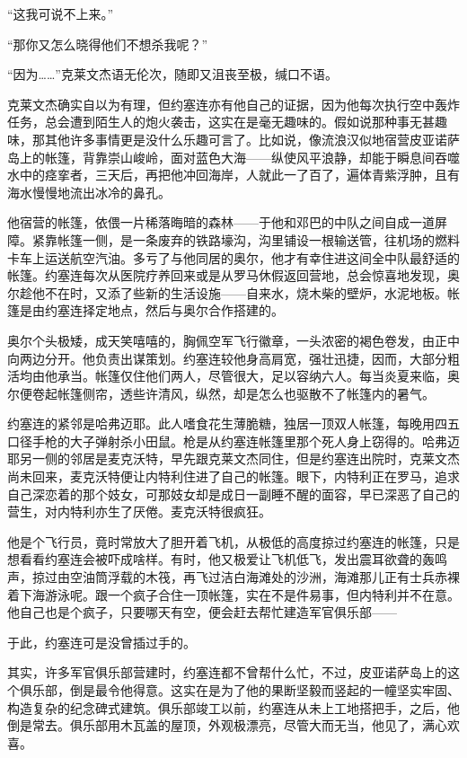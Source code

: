     “这我可说不上来。”

    “那你又怎么晓得他们不想杀我呢？”

    “因为……”克莱文杰语无伦次，随即又沮丧至极，缄口不语。

    克莱文杰确实自以为有理，但约塞连亦有他自己的证据，因为他每次执行空中轰炸任务，总会遭到陌生人的炮火袭击，这实在是毫无趣味的。假如说那种事无甚趣味，那其他许多事情更是没什么乐趣可言了。比如说，像流浪汉似地宿营皮亚诺萨岛上的帐篷，背靠崇山峻岭，面对蓝色大海——纵使风平浪静，却能于瞬息间吞噬水中的痉挛者，三天后，再把他冲回海岸，人就此一了百了，遍体青紫浮肿，且有海水慢慢地流出冰冷的鼻孔。

    他宿营的帐篷，依偎一片稀落晦暗的森林——于他和邓巴的中队之间自成一道屏障。紧靠帐篷一侧，是一条废弃的铁路壕沟，沟里铺设一根输送管，往机场的燃料卡车上运送航空汽油。多亏了与他同居的奥尔，他才有幸住进这间全中队最舒适的帐篷。约塞连每次从医院疗养回来或是从罗马休假返回营地，总会惊喜地发现，奥尔趁他不在时，又添了些新的生活设施——自来水，烧木柴的壁炉，水泥地板。帐篷是由约塞连择定地点，然后与奥尔合作搭建的。

 


    奥尔个头极矮，成天笑嘻嘻的，胸佩空军飞行徽章，一头浓密的褐色卷发，由正中向两边分开。他负责出谋策划。约塞连较他身高肩宽，强壮迅捷，因而，大部分粗活均由他承当。帐篷仅住他们两人，尽管很大，足以容纳六人。每当炎夏来临，奥尔便卷起帐篷侧帘，透些许清风，纵然，却是怎么也驱散不了帐篷内的暑气。

    约塞连的紧邻是哈弗迈耶。此人嗜食花生薄脆糖，独居一顶双人帐篷，每晚用四五口径手枪的大子弹射杀小田鼠。枪是从约塞连帐篷里那个死人身上窃得的。哈弗迈耶另一侧的邻居是麦克沃特，早先跟克莱文杰同住，但是约塞连出院时，克莱文杰尚未回来，麦克沃特便让内特利住进了自己的帐篷。眼下，内特利正在罗马，追求自己深恋着的那个妓女，可那妓女却是成日一副睡不醒的面容，早已深恶了自己的营生，对内特利亦生了厌倦。麦克沃特很疯狂。

    他是个飞行员，竟时常放大了胆开着飞机，从极低的高度掠过约塞连的帐篷，只是想看看约塞连会被吓成啥样。有时，他又极爱让飞机低飞，发出震耳欲聋的轰鸣声，掠过由空油筒浮载的木筏，再飞过洁白海滩处的沙洲，海滩那儿正有士兵赤裸着下海游泳呢。跟一个疯子合住一顶帐篷，实在不是件易事，但内特利并不在意。他自己也是个疯子，只要哪天有空，便会赶去帮忙建造军官俱乐部——

    于此，约塞连可是没曾插过手的。

    其实，许多军官俱乐部营建时，约塞连都不曾帮什么忙，不过，皮亚诺萨岛上的这个俱乐部，倒是最令他得意。这实在是为了他的果断坚毅而竖起的一幢坚实牢固、构造复杂的纪念碑式建筑。俱乐部竣工以前，约塞连从未上工地搭把手，之后，他倒是常去。俱乐部用木瓦盖的屋顶，外观极漂亮，尽管大而无当，他见了，满心欢喜。

